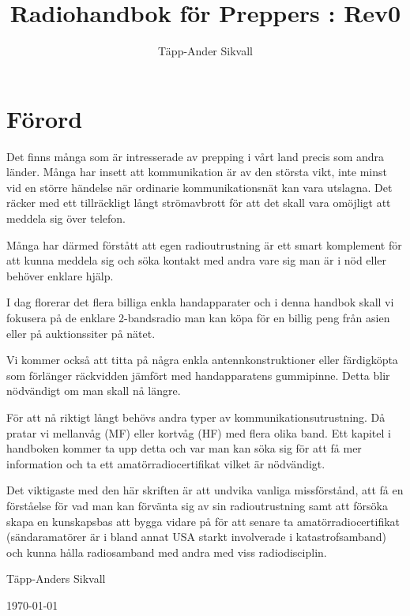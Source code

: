 \documentclass[12ypt,swedish,a4paper]{report}
\begin{document}
\title{Radiohandbok för Preppers : Rev0}
\author{Täpp-Ander Sikvall}
\maketitle

\begingroup
\setlength{\parskip}{1em plus 0.5em minus 0.2em}
\setlength{\parindent}{0pt}
\section*{Förord}

Det finns många som är intresserade av prepping i vårt land precis som andra länder. Många har insett att kommunikation är av den största vikt, inte minst vid en större händelse när ordinarie kommunikationsnät kan vara utslagna. Det räcker med ett tillräckligt långt strömavbrott för att det skall vara omöjligt att meddela sig över telefon.

Många har därmed förstått att egen radioutrustning är ett smart komplement för att kunna meddela sig och söka kontakt med andra vare sig man är i nöd eller behöver enklare hjälp.

I dag florerar det flera billiga enkla handapparater och i denna handbok skall vi fokusera på de enklare 2-bandsradio man kan köpa för en billig peng från asien eller på auktionssiter på nätet.

Vi kommer också att titta på några enkla antennkonstruktioner eller färdigköpta som förlänger räckvidden jämfört med handapparatens gummipinne. Detta blir nödvändigt om man skall nå längre.

För att nå riktigt långt behövs andra typer av kommunikationsutrustning. Då pratar vi mellanvåg (MF) eller kortvåg (HF) med flera olika band. Ett kapitel i handboken kommer ta upp detta och var man kan söka sig för att få mer information och ta ett amatörradiocertifikat vilket är nödvändigt.

Det viktigaste med den här skriften är att undvika vanliga missförstånd, att få en förståelse för vad man kan förvänta sig av sin radioutrustning samt att försöka skapa en kunskapsbas att bygga vidare på för att senare ta amatörradiocertifikat (sändaramatörer är i bland annat USA starkt involverade i katastrofsamband) och kunna hålla radiosamband med andra med viss radiodisciplin.

Täpp-Anders Sikvall

\today
\endgroup
\clearpage

\tableofcontents
\end{document}

